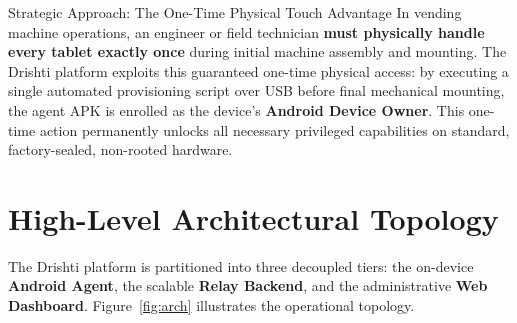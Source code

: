 \documentclass[11pt,a4paper]{article}
\begin{document}
\begin{archbox}{Strategic Approach: The One-Time Physical Touch Advantage}
In vending machine operations, an engineer or field technician \textbf{must physically handle every tablet exactly once} during initial machine assembly and mounting. The Drishti platform exploits this guaranteed one-time physical access: by executing a single automated provisioning script over USB before final mechanical mounting, the agent APK is enrolled as the device's \textbf{Android Device Owner}. This one-time action permanently unlocks all necessary privileged capabilities on standard, factory-sealed, non-rooted hardware.
\end{archbox}

\section{High-Level Architectural Topology}

The Drishti platform is partitioned into three decoupled tiers: the on-device \textbf{Android Agent}, the scalable \textbf{Relay Backend}, and the administrative \textbf{Web Dashboard}. Figure~\ref{fig:arch} illustrates the operational topology.
\end{document}
